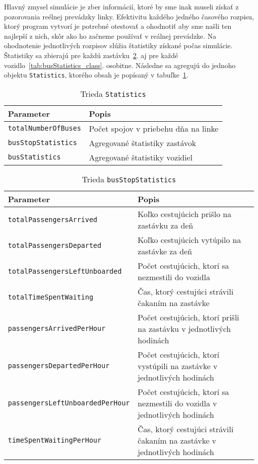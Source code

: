 Hlavný zmysel simulácie je zber informácií, ktoré by sme inak museli získať z pozorovania reélnej prevádzky linky.
Efektivitu každého jedného časového rozpisu, ktorý program vytvorí je potrebné otestovať a ohodnotiť aby sme našli ten najlepší z nich, skôr ako ho začneme používať v reálnej prevádzke.
Na ohodnotenie jednotlivých rozpisov slúžia štatistiky získané počas simulácie.
Štatistiky sa zbierajú pre každú zastávku~\ref{tab:busStopStatistics_class}. aj pre každé vozidlo~\ref{tab:busStatistics_class}. osobitne.
Následne sa agregujú do jednoho objektu \texttt{Statistics}, ktorého obsah je popísaný v tabuľke~\ref{tab:statistics_class}.
\begin{table}[h]\label{tab:statistics_class}
  \centering
  \begin{tabularx}{\textwidth}{|l|X|}
    \hline
    \textbf{Parameter} & \textbf{Popis} \\ \hline
    \texttt{totalNumberOfBuses} & Počet spojov v priebehu dňa na linke \\ \hline
    \texttt{busStopStatistics} & Agregované štatistiky zastávok \\ \hline
    \texttt{busStatistics} & Agregované štatistiky vozidiel \\ \hline
  \end{tabularx}
  \caption{Trieda \texttt{Statistics}}
\end{table}

\begin{table}[h]\label{tab:busStopStatistics_class}
  \centering
  \begin{tabularx}{\textwidth}{|l|X|}
    \hline
    \textbf{Parameter} & \textbf{Popis} \\ \hline
    \texttt{totalPassengersArrived} & Koľko cestujúcich prišlo na zastávku za deň \\ \hline
    \texttt{totalPassengersDeparted} & Koľko cestujúcich vytúpilo na zastávke za deň \\ \hline
    \texttt{totalPassengersLeftUnboarded} & Počet cestujúcich, ktorí sa nezmestili do vozidla \\ \hline
    \texttt{totalTimeSpentWaiting} & Čas, ktorý cestujúci strávili čakaním na zastávke \\ \hline
    \texttt{passengersArrivedPerHour} & Počet cestujúcich, ktorí prišli na zastávku v jednotlivých hodinách \\ \hline
    \texttt{passengersDepartedPerHour} & Počet cestujúcich, ktorí vystúpili na zastávke v jednotlivých hodinách \\ \hline
    \texttt{passengersLeftUnboardedPerHour} & Počet cestujúcich, ktorí sa nezmestili do vozidla v jednotlivých hodinách \\ \hline
    \texttt{timeSpentWaitingPerHour} & Čas, ktorý cestujúci strávili čakaním na zastávke v jednotlivých hodinách \\ \hline
  \end{tabularx}
  \caption{Trieda \texttt{busStopStatistics}}
\end{table}

